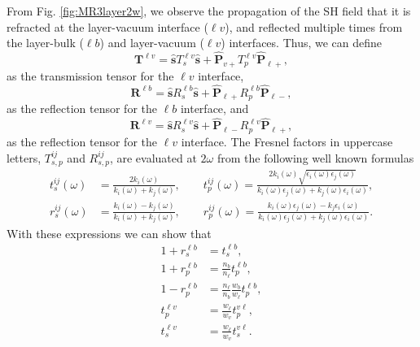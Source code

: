 From Fig. \ref{fig:MR3layer2w}, we observe the propagation of the SH field that
it is refracted at the layer-vacuum interface ($\ell v$), and  reflected
multiple times from the layer-bulk ($\ell b$) and layer-vacuum ($\ell v$)
interfaces. Thus, we can define
\begin{equation}\label{r5}
\mathbf{T}^{\ell v}
= \hat{\mathbf{s}}T_{s}^{\ell v}\hat{\mathbf{s}} 
+ \hat{\mathbf{P}}_{v+}T_{p}^{\ell v} \hat{\mathbf{P}}_{\ell +},
\end{equation}
as the transmission tensor for the $\ell v$ interface,
\begin{equation}\label{r6}
\mathbf{R}^{\ell b}
= \hat{\mathbf{s}}R_{s}^{\ell b}\hat{\mathbf{s}}
+ \hat{\mathbf{P}}_{\ell +}R_{p}^{\ell b} \hat{\mathbf{P}}_{\ell -},
\end{equation} 
as the reflection tensor for the $\ell b$ interface, and
\begin{equation}\label{r6b}
\mathbf{R}^{\ell v}
= \hat{\mathbf{s}}R_{s}^{\ell v}\hat{\mathbf{s}}
+ \hat{\mathbf{P}}_{\ell -}R_{p}^{\ell v} \hat{\mathbf{P}}_{\ell +},
\end{equation} 
as the reflection tensor for the $\ell v$ interface. The Fresnel factors in
uppercase letters, $T^{ij}_{s,p}$ and $R^{ij}_{s,p}$, are evaluated at $2\omega$
from the following well known formulas
\begin{equation}\label{e.f1}
\begin{split}
t_{s}^{ij}(\omega) &=
\frac{2k_{i}(\omega)}{k_{i}(\omega)+k_{j}(\omega)},
\quad\quad  
t_{p}^{ij}(\omega) =
\frac{2k_{i}(\omega)\sqrt{\epsilon_{i}(\omega)\epsilon_j(\omega)}}
     {k_{i}(\omega)\epsilon_{j}(\omega)+k_{j}(\omega)\epsilon_{i}(\omega)},\\
r_{s}^{ij}(\omega) &=
\frac{k_{i}(\omega) - k_{j}(\omega)}
     {k_{i}(\omega) + k_{j}(\omega)},
\quad\quad 
r_{p}^{ij}(\omega) =
\frac{k_{i}(\omega)\epsilon_{j}(\omega) - k_{j}\epsilon_{i}(\omega)}
     {k_{i}(\omega)\epsilon_{j}(\omega) + k_{j}(\omega)\epsilon_{i}(\omega)}. 
\end{split}
\end{equation}
With these expressions we can show that
\begin{equation}\label{mf}
\begin{split}
1 + r^{\ell b}_{s} &= t^{\ell b}_{s},\\
1 + r^{\ell b}_{p} &= \frac{n_{b}}{n_{\ell}}t^{\ell b}_{p},\\
1 - r^{\ell b}_{p} &= \frac{n_{\ell}}{n_{b}}\frac{w_{b}}{w_{\ell}}t^{\ell b}_{p},\\
t^{\ell v}_{p} &= \frac{w_{\ell}}{w_{v}}t^{v\ell}_{p},\\
t^{\ell v}_{s} &= \frac{w_{\ell}}{w_{v}}t^{v\ell}_{s}.
\end{split}
\end{equation}


